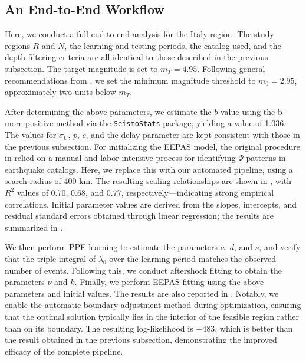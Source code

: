 \documentclass[extra,mreferee]{gji}
\theoremstyle{lemma}
\begin{document}
\subsection{An End-to-End Workflow}

Here, we conduct a full end-to-end analysis for the Italy region. The study regions $R$ and $N$, the learning and testing periods, the catalog used, and the depth filtering criteria are all identical to those described in the previous subsection. The target magnitude is set to $m_T = 4.95$. Following general recommendations from \cite{rhoades202220}, we set the minimum magnitude threshold to $m_0 = 2.95$, approximately two units below $m_T$.

After determining the above parameters, we estimate the $b$-value using the b-more-positive method \cite{lippiello2024b} via the \texttt{SeismoStats} package, yielding a value of 1.036. The values for $\sigma_U$, $p$, $c$, and the delay parameter are kept consistent with those in the previous subsection. For initializing the EEPAS model, the original procedure in \cite{2023ER} relied on a manual and labor-intensive process for identifying $\Psi$ patterns in earthquake catalogs. Here, we replace this with our automated pipeline, using a search radius of 400 km. The resulting scaling relationships are shown in , with $R^2$ values of 0.70, 0.68, and 0.77, respectively—indicating strong empirical correlations. Initial parameter values are derived from the slopes, intercepts, and residual standard errors obtained through linear regression; the results are summarized in .

We then perform PPE learning to estimate the parameters $a$, $d$, and $s$, and verify that the triple integral of $\lambda_0$ over the learning period matches the observed number of events. Following this, we conduct aftershock fitting to obtain the parameters $\nu$ and $k$. Finally, we perform EEPAS fitting using the above parameters and initial values. The results are also reported in . Notably, we enable the automatic boundary adjustment method during optimization, ensuring that the optimal solution typically lies in the interior of the feasible region rather than on its boundary. The resulting log-likelihood is $-483$, which is better than the result obtained in the previous subsection, demonstrating the improved efficacy of the complete pipeline.
\end{document}
